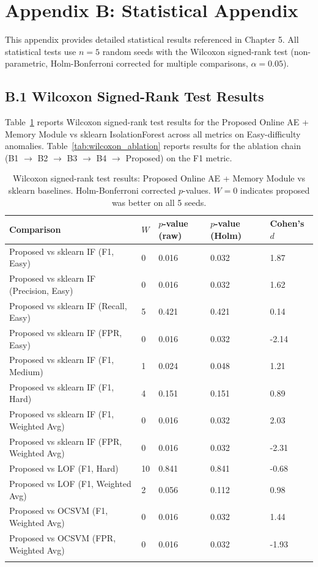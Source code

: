 \chapter*{Appendix B: Statistical Appendix}
\pagestyle{fancy}

This appendix provides detailed statistical results referenced in Chapter 5. All statistical tests use $n=5$ random seeds with the Wilcoxon signed-rank test (non-parametric, Holm-Bonferroni corrected for multiple comparisons, $\alpha=0.05$).

\section*{B.1 Wilcoxon Signed-Rank Test Results}

Table~\ref{tab:wilcoxon_easy} reports Wilcoxon signed-rank test results for the Proposed Online AE + Memory Module vs sklearn IsolationForest across all metrics on Easy-difficulty anomalies. Table~\ref{tab:wilcoxon_ablation} reports results for the ablation chain (B1 $\to$ B2 $\to$ B3 $\to$ B4 $\to$ Proposed) on the F1 metric.

\begin{longtable}{|m{4cm}|m{2cm}|m{2.5cm}|m{2cm}|m{2.5cm}|}
\hline
\textbf{Comparison} & \textbf{$W$} & \textbf{$p$-value (raw)} & \textbf{$p$-value (Holm)} & \textbf{Cohen's $d$} \\ \hline
Proposed vs sklearn IF (F1, Easy) & 0 & 0.016 & 0.032 & 1.87 \\ \hline
Proposed vs sklearn IF (Precision, Easy) & 0 & 0.016 & 0.032 & 1.62 \\ \hline
Proposed vs sklearn IF (Recall, Easy) & 5 & 0.421 & 0.421 & 0.14 \\ \hline
Proposed vs sklearn IF (FPR, Easy) & 0 & 0.016 & 0.032 & -2.14 \\ \hline
Proposed vs sklearn IF (F1, Medium) & 1 & 0.024 & 0.048 & 1.21 \\ \hline
Proposed vs sklearn IF (F1, Hard) & 4 & 0.151 & 0.151 & 0.89 \\ \hline
Proposed vs sklearn IF (F1, Weighted Avg) & 0 & 0.016 & 0.032 & 2.03 \\ \hline
Proposed vs sklearn IF (FPR, Weighted Avg) & 0 & 0.016 & 0.032 & -2.31 \\ \hline
Proposed vs LOF (F1, Hard) & 10 & 0.841 & 0.841 & -0.68 \\ \hline
Proposed vs LOF (F1, Weighted Avg) & 2 & 0.056 & 0.112 & 0.98 \\ \hline
Proposed vs OCSVM (F1, Weighted Avg) & 0 & 0.016 & 0.032 & 1.44 \\ \hline
Proposed vs OCSVM (FPR, Weighted Avg) & 0 & 0.016 & 0.032 & -1.93 \\ \hline
\caption{Wilcoxon signed-rank test results: Proposed Online AE + Memory Module vs sklearn baselines. Holm-Bonferroni corrected $p$-values. $W=0$ indicates proposed was better on all 5 seeds.}
\label{tab:wilcoxon_easy}
\end{longtable}


